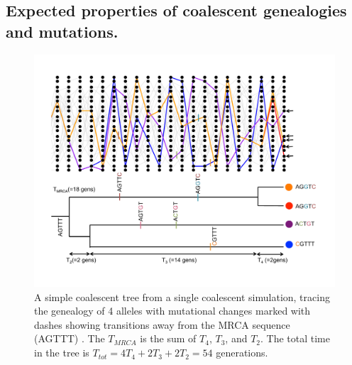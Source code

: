 \subsection{Expected properties of coalescent genealogies and
  mutations.} 

\begin{figure}
\begin{center}
\includegraphics[width= \textwidth]{figures/Coalescent/Coal_w_muts.pdf}
\end{center}
\caption{A simple coalescent tree from a single coalescent simulation, tracing the genealogy of 4 alleles with mutational changes marked with dashes showing transitions away from the MRCA sequence (AGTTT) . The $T_{MRCA}$ is the sum of $T_4$, $T_3$, and $T_2$. The total time in the tree is $T_{tot}=4 T_4+2T_3 + 2T_2= 54$ generations. } \label{fig:Coal_w_muts}
\end{figure}


